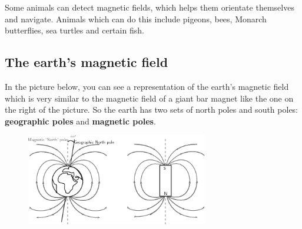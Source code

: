     \addtocounter{footnote}{-0}
    
      \par 
      \label{m37830*id128241}Some animals can detect magnetic fields, which
helps them orientate themselves and navigate. Animals which can do this include pigeons, bees, Monarch
butterflies, sea turtles and certain fish.\par 
      \label{m37830*uid22}
            \subsection{ The earth's magnetic field}
            \nopagebreak
            
        
        \label{m37830*id128255}In the picture below, you can see a representation of the earth's magnetic
field which is very similar to the magnetic field of a giant bar magnet like
the one on the right of the picture. So the earth has two sets of north poles
and south poles: \textbf{geographic poles} and \textbf{magnetic poles}.\par 
        \label{m37830*id128272}
          
    \setcounter{subfigure}{0}


	\begin{figure}[H] %
    \begin{center}
    \label{m37830*id128275!!!underscore!!!media}\label{m37830*id128275!!!underscore!!!printimage}\includegraphics[width=300px]{col11305.imgs/m37830_PG10C7_016.png} %
        
      \vspace{2pt}
    \vspace{.1in}
    
    \end{center}

 \end{figure}   

    \addtocounter{footnote}{-0}
    
